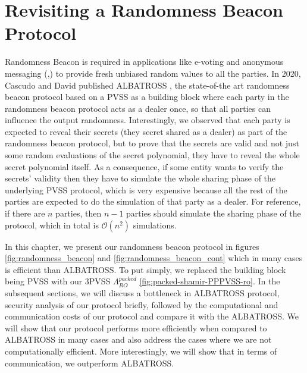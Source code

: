 \chapter{Revisiting a Randomness Beacon Protocol}
\label{cha:n}

Randomness Beacon \cite{RABIN1983256} is required in applications like e-voting \cite{10.5555/1496711.1496734} 
and anonymous messaging (\cite{180263},\cite{10.1145/2815400.2815417}) to provide fresh unbiased random values to all the 
parties. In 2020, Cascudo and David published ALBATROSS \cite{cryptoeprint:2020/644}, the state-of-the art randomness 
beacon protocol based on a PVSS as a building block where each party in the randomness beacon protocol acts as a dealer once, so that all 
parties can influence the output randomness. Interestingly, we observed that each party is expected to reveal 
their secrets (they secret shared as a dealer) as part of the randomness beacon protocol, but to prove that the 
secrets are valid and not just some random evaluations of the secret polynomial, they have to reveal the whole 
secret polynomial itself. As a consequence, if some entity wants to verify the secrets' validity then they have to 
simulate the whole sharing phase of the underlying PVSS protocol, which is very expensive because all the rest of the 
parties are expected to do the simulation of that party as a dealer. For reference, if there are $n$ parties, then 
$n-1$ parties should simulate the sharing phase of the protocol, which in total is $\mathcal{O}(n^2)$ simulations.\par

In this chapter, we present our randomness beacon protocol in figures \ref{fig:randomness_beacon} and \ref{fig:randomness_beacon_cont} 
which in many cases is efficient than ALBATROSS. To put simply, we replaced the building block being PVSS with 
our 3PVSS $\Lambda_{RO}^{packed}$ \ref{fig:packed-shamir-PPPVSS-ro}. In the subsequent sections, we will discuss a 
bottleneck in ALBATROSS protocol, security 
analysis of our protocol briefly, followed by the 
computational and communication costs of our protocol and compare it with the ALBATROSS. We will show that our protocol 
performs more efficiently when compared to ALBATROSS in many cases and also address the cases where we are not computationally efficient.
More interestingly, we will show that in terms of communication, we outperform ALBATROSS.




